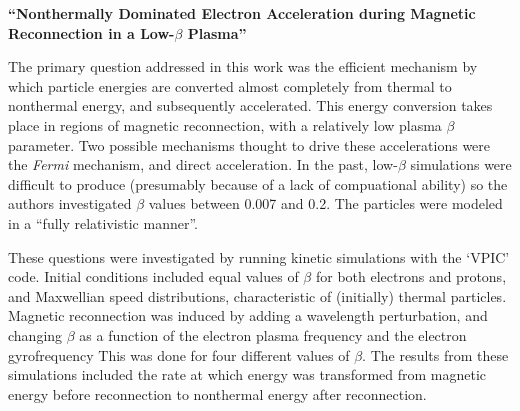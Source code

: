 \documentclass[12pt]{article}
\begin{document}
\begin{center}\large\textbf{
``Nonthermally Dominated Electron Acceleration during Magnetic
Reconnection in a Low-\boldmath$\beta$ Plasma''}
\end{center}
The primary question addressed in this work was the
efficient mechanism by which particle energies are converted
almost completely
from thermal to nonthermal energy, and subsequently accelerated.
This energy conversion takes place in regions of magnetic
reconnection, with a relatively low plasma $\beta$ parameter. 
Two possible mechanisms thought to drive these accelerations were
the \emph{Fermi} mechanism,
and direct acceleration.
In the past, low-$\beta$ simulations were difficult to produce
(presumably because of a lack of compuational ability)
so the authors investigated $\beta$ values between 0.007 and 0.2.
The particles were modeled in a ``fully relativistic manner''.

These
questions were investigated by running kinetic simulations with the
`VPIC' code.
Initial conditions included
equal values of $\beta$ for both electrons and protons,
and Maxwellian speed distributions, characteristic of (initially)
thermal particles.
Magnetic reconnection was induced by adding
a wavelength perturbation, and changing $\beta$ as a function of the
electron plasma frequency and the electron gyrofrequency
This was done for four different values of $\beta$.
The results from these simulations included the rate at which energy
was transformed from magnetic energy before reconnection to nonthermal
energy after reconnection. 
\end{document}
